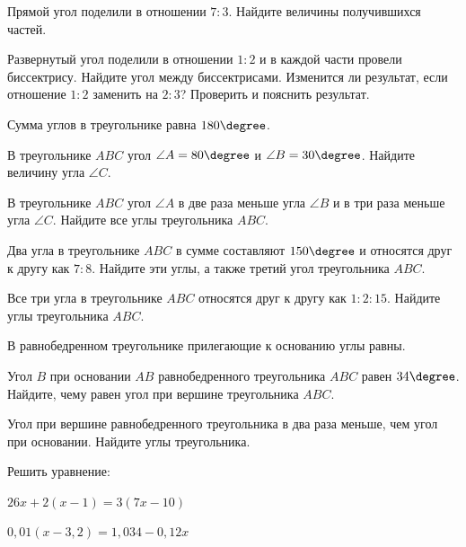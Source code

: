 \begin{class}[number=3]
	\begin{listofex}
		\item Прямой угол поделили в отношении \( 7:3 \). Найдите величины получившихся частей.
		\item Развернутый угол поделили в отношении \( 1:2 \) и в каждой части провели биссектрису. Найдите угол между биссектрисами. Изменится ли результат, если отношение \( 1:2 \) заменить на \( 2:3 \)? Проверить и пояснить результат.
	\end{listofex}
	\begin{definit}
		Сумма углов в треугольнике равна \( 180\degree \).
	\end{definit}
	\begin{listofex}
		\item В треугольнике \( ABC \) угол \( \angle A = 80\degree \) и \( \angle B = 30\degree \). Найдите величину угла \( \angle C \).
		\item В треугольнике \( ABC \) угол \( \angle A \) в две раза меньше угла \( \angle B \) и в три раза меньше угла \( \angle C \). Найдите все углы треугольника \( ABC \).
		\item Два угла в треугольнике \( ABC \) в сумме составляют \( 150\degree \) и относятся друг к другу как \( 7:8 \). Найдите эти углы, а также третий угол треугольника \( ABC \).
		\item Все три угла в треугольнике \( ABC \) относятся друг к другу как \( 1:2:15 \). Найдите углы треугольника \( ABC \).
	\end{listofex}
	\begin{definit}
		В равнобедренном треугольнике прилегающие к основанию углы равны.
	\end{definit}
	\begin{listofex}[resume]
		\item Угол \( B \) при основании \( AB \) равнобедренного треугольника \( ABC \) равен \( 34\degree \). Найдите, чему равен угол при вершине треугольника \( ABC \).
		\item Угол при вершине равнобедренного треугольника в два раза меньше, чем угол при основании. Найдите углы треугольника.
		\item Решить уравнение:
		\begin{enumcols}[itemcolumns=2]
			\item \( 26x+2(x-1)=3(7x-10) \)
			\item \( 0,01(x-3,2)=1,034-0,12x \)
		\end{enumcols}
	\end{listofex}
\end{class}
